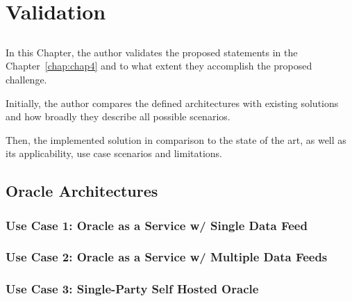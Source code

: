 \chapter{Validation} \label{chap:chap7}

\section*{}
In this Chapter, the author validates the proposed statements in the Chapter~\ref{chap:chap4} and to what extent they accomplish the proposed challenge.

Initially, the author compares the defined architectures with existing solutions and how broadly they describe all possible scenarios.

Then, the implemented solution in comparison to the state of the art, as well as its applicability, use case scenarios and limitations.


\section{Oracle Architectures}


\subsection{Use Case 1: Oracle as a Service w/ Single Data Feed}





\subsection{Use Case 2: Oracle as a Service w/ Multiple Data Feeds}


\subsection{Use Case 3: Single-Party Self Hosted Oracle}

